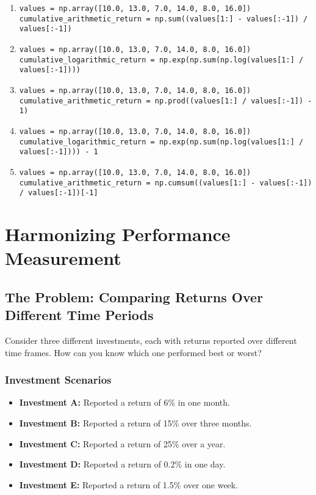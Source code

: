 \documentclass{article}
\begin{document}
\begin{enumerate}
    \begin{enumerate}
        \item \texttt{values = np.array([10.0, 13.0, 7.0, 14.0, 8.0, 16.0]) \\
        cumulative\_arithmetic\_return = np.sum((values[1:] - values[:-1]) / values[:-1])}
        \item \texttt{values = np.array([10.0, 13.0, 7.0, 14.0, 8.0, 16.0]) \\
        cumulative\_logarithmic\_return = np.exp(np.sum(np.log(values[1:] / values[:-1])))}
        \item \texttt{values = np.array([10.0, 13.0, 7.0, 14.0, 8.0, 16.0]) \\
        cumulative\_arithmetic\_return = np.prod((values[1:] / values[:-1]) - 1)}
        \item \texttt{values = np.array([10.0, 13.0, 7.0, 14.0, 8.0, 16.0]) \\
        cumulative\_logarithmic\_return = np.exp(np.sum(np.log(values[1:] / values[:-1]))) - 1}
        \item \texttt{values = np.array([10.0, 13.0, 7.0, 14.0, 8.0, 16.0]) \\
        cumulative\_arithmetic\_return = np.cumsum((values[1:] - values[:-1]) / values[:-1])[-1]}
    \end{enumerate}

\end{enumerate}



\clearpage

\section{Harmonizing Performance Measurement}

\subsection{The Problem: Comparing Returns Over Different Time Periods}

Consider three different investments, each with returns reported over different time frames. How can you know which one performed best or worst?

\subsubsection*{Investment Scenarios}

\begin{itemize}
    \item \textbf{Investment A:} Reported a return of 6\% in one month.
    \item \textbf{Investment B:} Reported a return of 15\% over three months.
    \item \textbf{Investment C:} Reported a return of 25\% over a year.
    \item \textbf{Investment D:} Reported a return of 0.2\% in one day.
    \item \textbf{Investment E:} Reported a return of 1.5\% over one week.
\end{itemize}
\end{document}
